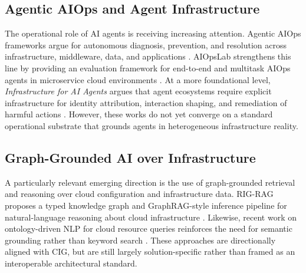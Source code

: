\documentclass[conference]{IEEEtran}
\begin{document}
\subsection{Agentic AIOps and Agent Infrastructure}
The operational role of AI agents is receiving increasing attention. Agentic AIOps frameworks argue for autonomous diagnosis, prevention, and resolution across infrastructure, middleware, data, and applications \cite{zota2025agentic}. AIOpsLab strengthens this line by providing an evaluation framework for end-to-end and multitask AIOps agents in microservice cloud environments \cite{chen2025aiopslab}. At a more foundational level, \emph{Infrastructure for AI Agents} argues that agent ecosystems require explicit infrastructure for identity attribution, interaction shaping, and remediation of harmful actions \cite{hadfield2025infraagents}. However, these works do not yet converge on a standard operational substrate that grounds agents in heterogeneous infrastructure reality.

\subsection{Graph-Grounded AI over Infrastructure}
A particularly relevant emerging direction is the use of graph-grounded retrieval and reasoning over cloud configuration and infrastructure data. RIG-RAG proposes a typed knowledge graph and GraphRAG-style inference pipeline for natural-language reasoning about cloud infrastructure \cite{rigrag2025}. Likewise, recent work on ontology-driven NLP for cloud resource queries reinforces the need for semantic grounding rather than keyword search \cite{sunkara2025ontology}. These approaches are directionally aligned with CIG, but are still largely solution-specific rather than framed as an interoperable architectural standard.
\end{document}
